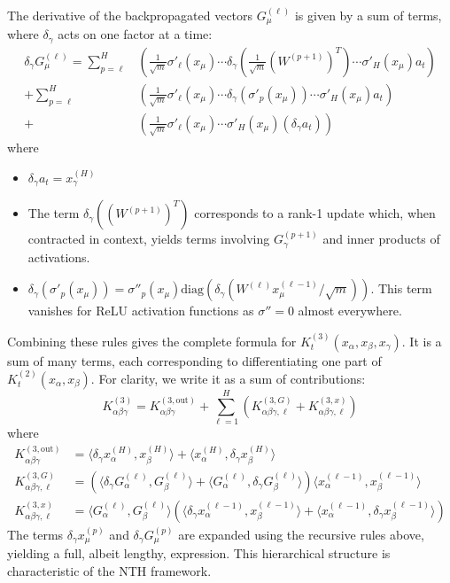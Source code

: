 \documentclass[11pt,a4paper]{article}
\theoremstyle{definition}
\begin{document}
The derivative of the backpropagated vectors $G^{(\ell)}_\mu$ is given by a sum of terms, where $\delta_\gamma$ acts on one factor at a time:
\begin{align}
\delta_\gamma G^{(\ell)}_\mu = \sum_{p=\ell}^{H} & \left( \frac{1}{\sqrt{m}}\sigma'_\ell(x_\mu) \cdots \delta_\gamma(\frac{1}{\sqrt{m}}(W^{(p+1)})^T) \cdots \sigma'_H(x_\mu) a_t \right) \\
+ \sum_{p=\ell}^{H} & \left( \frac{1}{\sqrt{m}}\sigma'_\ell(x_\mu) \cdots \delta_\gamma(\sigma'_{p}(x_\mu)) \cdots \sigma'_H(x_\mu) a_t \right) \\
+ & \left( \frac{1}{\sqrt{m}}\sigma'_\ell(x_\mu) \cdots \sigma'_H(x_\mu) (\delta_\gamma a_t) \right)
\end{align}
where
\begin{itemize}
    \item $\delta_\gamma a_t = x^{(H)}_\gamma$
    \item The term $\delta_\gamma((W^{(p+1)})^T)$ corresponds to a rank-1 update which, when contracted in context, yields terms involving $G^{(p+1)}_\gamma$ and inner products of activations.
    \item $\delta_\gamma(\sigma'_{p}(x_\mu)) = \sigma''_{p}(x_\mu) \text{diag}(\delta_\gamma(W^{(\ell)}x^{(\ell-1)}_\mu/\sqrt{m}))$. This term vanishes for ReLU activation functions as $\sigma''=0$ almost everywhere.
\end{itemize}

Combining these rules gives the complete formula for $K^{(3)}_t(x_\alpha, x_\beta, x_\gamma)$. It is a sum of many terms, each corresponding to differentiating one part of $K^{(2)}_t(x_\alpha, x_\beta)$. For clarity, we write it as a sum of contributions:
\begin{equation}
K^{(3)}_{\alpha\beta\gamma} = K^{(3, \text{out})}_{\alpha\beta\gamma} + \sum_{\ell=1}^H \left( K^{(3, G)}_{\alpha\beta\gamma, \ell} + K^{(3, x)}_{\alpha\beta\gamma, \ell} \right)
\end{equation}
where
\begin{align}
K^{(3, \text{out})}_{\alpha\beta\gamma} &= \langle \delta_\gamma x^{(H)}_\alpha, x^{(H)}_\beta \rangle + \langle x^{(H)}_\alpha, \delta_\gamma x^{(H)}_\beta \rangle \\
K^{(3, G)}_{\alpha\beta\gamma, \ell} &= \left( \langle \delta_\gamma G^{(\ell)}_\alpha, G^{(\ell)}_\beta \rangle + \langle G^{(\ell)}_\alpha, \delta_\gamma G^{(\ell)}_\beta \rangle \right) \langle x^{(\ell-1)}_\alpha, x^{(\ell-1)}_\beta \rangle \\
K^{(3, x)}_{\alpha\beta\gamma, \ell} &= \langle G^{(\ell)}_\alpha, G^{(\ell)}_\beta \rangle \left( \langle \delta_\gamma x^{(\ell-1)}_\alpha, x^{(\ell-1)}_\beta \rangle + \langle x^{(\ell-1)}_\alpha, \delta_\gamma x^{(\ell-1)}_\beta \rangle \right)
\end{align}
The terms $\delta_\gamma x^{(p)}_\mu$ and $\delta_\gamma G^{(p)}_\mu$ are expanded using the recursive rules above, yielding a full, albeit lengthy, expression. This hierarchical structure is characteristic of the NTH framework.
\end{document}
